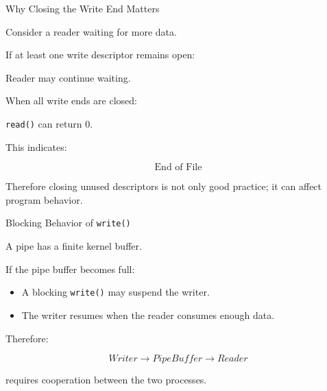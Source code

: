 \documentclass[aspectratio=169]{beamer}
\begin{document}
\begin{frame}{Why Closing the Write End Matters}

Consider a reader waiting for more data.

If at least one write descriptor remains open:

\begin{center}
Reader may continue waiting.
\end{center}

When all write ends are closed:

\begin{center}
\texttt{read()} can return 0.
\end{center}

This indicates:

\[
\boxed{\text{End of File}}
\]

Therefore closing unused descriptors is not only good practice;
it can affect program behavior.

\end{frame}

\begin{frame}{Blocking Behavior of \texttt{write()}}

A pipe has a finite kernel buffer.

If the pipe buffer becomes full:

\begin{itemize}
    \item A blocking \texttt{write()} may suspend the writer.
    \item The writer resumes when the reader consumes enough data.
\end{itemize}

Therefore:

\[
Writer
\rightarrow
Pipe Buffer
\rightarrow
Reader
\]

requires cooperation between the two processes.

\end{frame}
\end{document}
